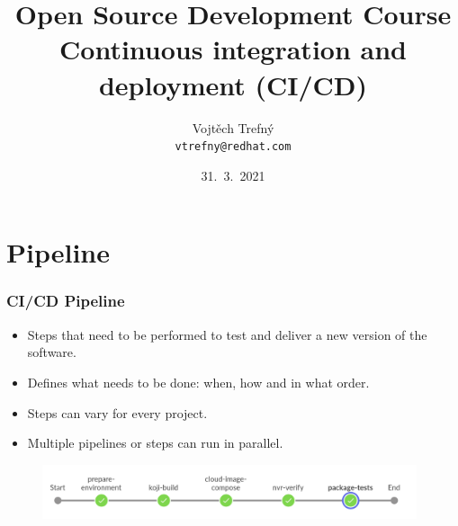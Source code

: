 \documentclass[aspectratio=169]{beamer}
\title[Open Source Development Course]{Open Source Development Course\\ \small Continuous integration and deployment (CI/CD)}
\author{Vojtěch Trefný\\ \small \texttt{vtrefny@redhat.com}\\}
\date{31.~3.~2021}
\institute{\faTwitter\, \href{https://twitter.com/vojtechtrefny}{twitter.com/vojtechtrefny} \\ \faGithub\, \href{https://github.com/vojtechtrefny}{github.com/vojtechtrefny} \\ \faGitlab\ \href{https://gitlab.com/vtrefny}{gitlab.com/vtrefny}}
\begin{document}
{ 
\begin{frame}
\titlepage
\end{frame}
}

\newcommand*\openquote{\makebox(25,-22){\scalebox{5}{``}}}
\newcommand*\closequote{\makebox(25,-22){\scalebox{5}{''}}}


\section{Pipeline}

\begin{frame}
	\frametitle{CI/CD Pipeline}

	\begin{block}{}
		\begin{itemize}
			\item Steps that need to be performed to test and deliver a new version of the software.
			\item Defines what needs to be done: when, how and in what order.
			\item Steps can vary for every project.
			\item Multiple pipelines or steps can run in parallel.
		\end{itemize}
	\end{block}
	
	\begin{figure}[ht!]
	\begin{center}
  	  \includegraphics[width=11cm]{img/fedora-pipeline.png}
	\end{center}
	\end{figure}
\end{frame}
\end{document}
